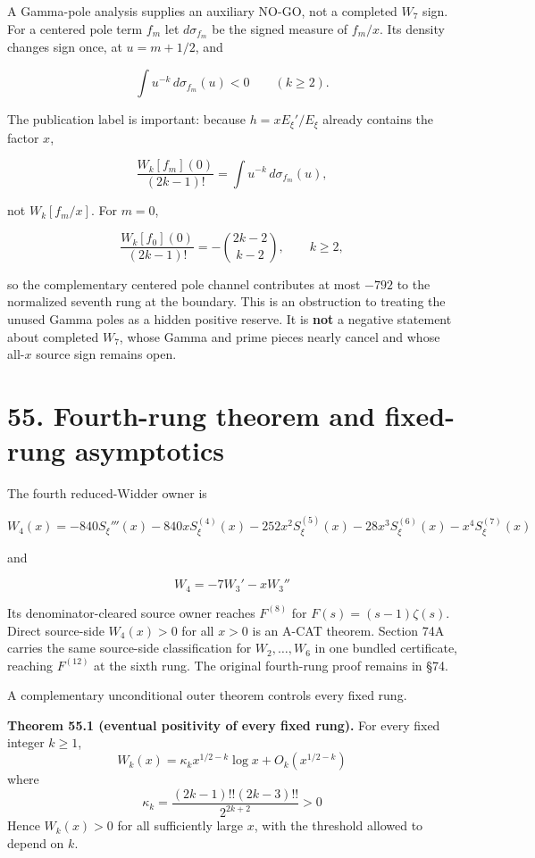 \documentclass[
  11pt,
]{book}
\renewenvironment{quote}
  {\begin{tcolorbox}[
      enhanced,
      breakable,
      colback=tncream,
      colframe=tnrust,
      boxrule=0.8pt,
      arc=1.5pt,
      left=7pt,
      right=7pt,
      top=6pt,
      bottom=6pt]}
  {\end{tcolorbox}}
\begin{document}
A Gamma-pole analysis supplies an auxiliary NO-GO, not a completed
\(W_7\) sign. For a centered pole term \(f_m\) let \(d\sigma_{f_m}\) be
the signed measure of \(f_m/x\). Its density changes sign once, at
\(u=m+1/2\), and

\[
\int u^{-k}\,d\sigma_{f_m}(u)<0\qquad(k\ge2).
\tag{74A.10}
\]

The publication label is important: because \(h=xE_\xi'/E_\xi\) already
contains the factor \(x\),

\[
\boxed{\frac{W_k[f_m](0)}{(2k-1)!}
=\int u^{-k}\,d\sigma_{f_m}(u),}
\tag{74A.11}
\]

not \(W_k[f_m/x]\). For \(m=0\),

\[
\frac{W_k[f_0](0)}{(2k-1)!}
=-\binom{2k-2}{k-2},\qquad k\ge2,
\tag{74A.12}
\]

so the complementary centered pole channel contributes at most \(-792\)
to the normalized seventh rung at the boundary. This is an obstruction
to treating the unused Gamma poles as a hidden positive reserve. It is
\textbf{not} a negative statement about completed \(W_7\), whose Gamma
and prime pieces nearly cancel and whose all-\(x\) source sign remains
open.

\section{55. Fourth-rung theorem and fixed-rung
asymptotics}\label{fourth-rung-theorem-and-fixed-rung-asymptotics}

The fourth reduced-Widder owner is

\[
W_4(x)
=-840S_\xi'''(x)-840xS_\xi^{(4)}(x)
-252x^2S_\xi^{(5)}(x)
-28x^3S_\xi^{(6)}(x)-x^4S_\xi^{(7)}(x)
\tag{55.1}
\]

and

\[
W_4=-7W_3'-xW_3''
\tag{55.2}
\]

Its denominator-cleared source owner reaches \(F^{(8)}\) for
\(F(s)=(s-1)\zeta(s)\). Direct source-side \(W_4(x)>0\) for all \(x>0\)
is an A-CAT theorem. Section 74A carries the same source-side
classification for \(W_2,\ldots,W_6\) in one bundled certificate,
reaching \(F^{(12)}\) at the sixth rung. The original fourth-rung proof
remains in §74.

A complementary unconditional outer theorem controls every fixed rung.

\begin{quote}
\textbf{Theorem 55.1 (eventual positivity of every fixed rung).} For
every fixed integer \(k\ge1\), \[
\boxed{
W_k(x)
=\kappa_kx^{1/2-k}\log x
+O_k(x^{1/2-k})}
\tag{55.3}
\] where \[
\boxed{
\kappa_k=
\frac{(2k-1)!!(2k-3)!!}{2^{2k+2}}>0}
\tag{55.4}
\] Hence \(W_k(x)>0\) for all sufficiently large \(x\), with the
threshold allowed to depend on \(k\).
\end{quote}
\end{document}
